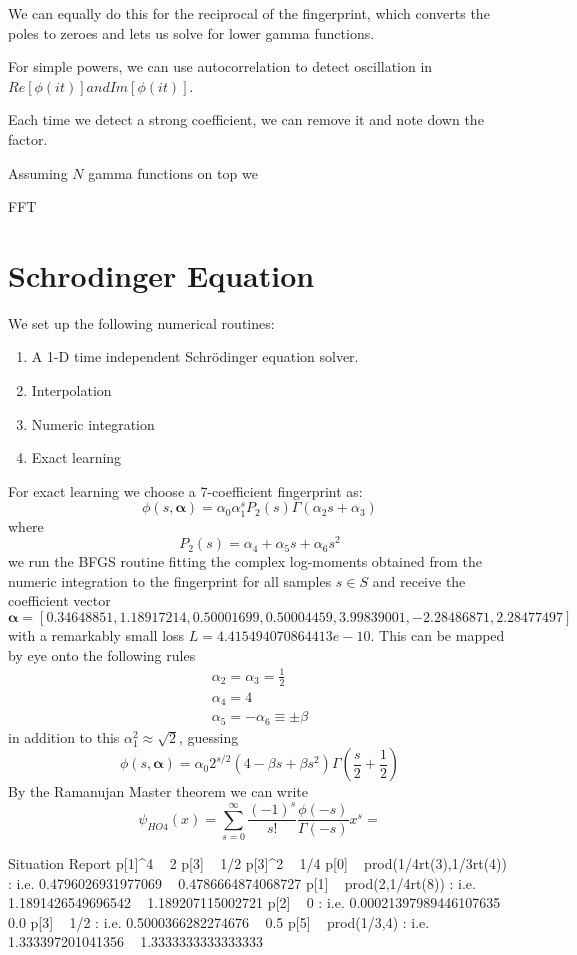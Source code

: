 \documentclass{article}
\begin{document}
We can equally do this for the reciprocal of the fingerprint, which converts the poles to zeroes and lets us solve for lower gamma functions.

For simple powers, we can use autocorrelation to detect oscillation in $Re[\phi(it)] and Im[\phi(it)]$.

Each time we detect a strong coefficient, we can remove it and note down the factor.


Assuming $N$ gamma functions on top we 


FFT


\section{Schrodinger Equation}
We set up the following numerical routines:

\begin{enumerate}
\item A 1-D time independent Schr\"odinger equation solver.
\item Interpolation
\item Numeric integration
\item Exact learning
\end{enumerate}

For exact learning we choose a 7-coefficient fingerprint as:
$$
\phi(s,\boldsymbol \alpha) = \alpha_0 \alpha_1^s P_2(s)\Gamma(\alpha_2 s + \alpha_3)
$$
where
$$
P_2(s) = \alpha_4 + \alpha_5 s + \alpha_6 s^2
$$
we run the BFGS routine fitting the complex log-moments obtained from the numeric integration to the fingerprint for all samples $s \in S$ and receive the coefficient vector
$$
\boldsymbol \alpha = [ 0.34648851,  1.18917214,  0.50001699,  0.50004459,  3.99839001, -2.28486871, 2.28477497]
$$  
with a remarkably small loss $L = 4.415494070864413e-10$. This can be mapped by eye onto the following rules
\begin{align}
\alpha_2 = \alpha_3 = \frac{1}{2} \\
\alpha_4 = 4 \\
\alpha_5 = -\alpha_6 \equiv \pm \beta
\end{align}
in addition to this $\alpha_1^2 \approx \sqrt{2}$, guessing
$$
\phi(s,\boldsymbol \alpha) = \alpha_0 2^{s/2} (4 - \beta s + \beta s^2)\Gamma\left(\frac{s}{2} + \frac{1}{2}\right)
$$
By the Ramanujan Master theorem we can write 
$$
\psi_{HO4}(x) = \sum_{s=0}^\infty \frac{(-1)^s}{s!} \frac{\phi(-s)}{\Gamma(-s)} x^s = 
$$


Situation Report
p[1]^4 ~ 2
p[3] ~ 1/2
p[3]^2 ~ 1/4
p[0] ~ prod(1/4rt(3),1/3rt(4)) : i.e. 0.4796026931977069 ~ 0.4786664874068727
p[1] ~ prod(2,1/4rt(8)) : i.e. 1.1891426549696542 ~ 1.189207115002721
p[2] ~ 0 : i.e. 0.00021397989446107635 ~ 0.0
p[3] ~ 1/2 : i.e. 0.5000366282274676 ~ 0.5
p[5] ~ prod(1/3,4) : i.e. 1.333397201041356 ~ 1.3333333333333333
\end{document}
